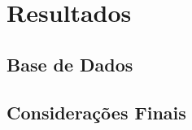\chapter{Resultados}\label{cap:resultados}



\section{Base de Dados}

\lipsum[72]

\section{Considerações Finais}

\lipsum[74]
